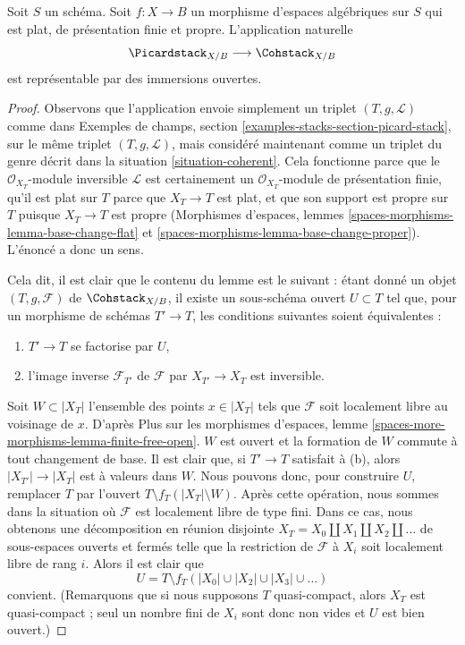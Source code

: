 \begin{lemma}
\label{lemma-picard-stack-open-in-coh}
Soit $S$ un schéma. Soit $f : X \to B$ un morphisme d'espaces algébriques sur
$S$ qui est plat, de présentation finie et propre. L'application naturelle
$$
\Picardstack_{X/B} \longrightarrow \Cohstack_{X/B}
$$
est représentable par des immersions ouvertes.
\end{lemma}

\begin{proof}
Observons que l'application envoie simplement un triplet
$(T, g, \mathcal{L})$ comme dans Exemples de champs, section
\ref{examples-stacks-section-picard-stack}, sur le même triplet
$(T, g, \mathcal{L})$, mais considéré maintenant comme un triplet du genre
décrit dans la situation \ref{situation-coherent}. Cela fonctionne parce que
le $\mathcal{O}_{X_T}$-module inversible $\mathcal{L}$ est certainement un
$\mathcal{O}_{X_T}$-module de présentation finie, qu'il est plat sur $T$ parce
que $X_T \to T$ est plat, et que son support est propre sur $T$ puisque
$X_T \to T$ est propre (Morphismes d'espaces, lemmes
\ref{spaces-morphisms-lemma-base-change-flat} et
\ref{spaces-morphisms-lemma-base-change-proper}). L'énoncé a donc un sens.

\medskip\noindent
Cela dit, il est clair que le contenu du lemme est le suivant : étant donné un
objet $(T, g, \mathcal{F})$ de $\Cohstack_{X/B}$, il existe un sous-schéma
ouvert $U \subset T$ tel que, pour un morphisme de schémas $T' \to T$, les
conditions suivantes soient équivalentes :
\begin{enumerate}
\item[(a)] $T' \to T$ se factorise par $U$,
\item[(b)] l'image inverse $\mathcal{F}_{T'}$ de $\mathcal{F}$ par
$X_{T'} \to X_T$ est inversible.
\end{enumerate}
Soit $W \subset |X_T|$ l'ensemble des points $x \in |X_T|$ tels que
$\mathcal{F}$ soit localement libre au voisinage de $x$. D'après Plus sur les
morphismes d'espaces, lemme
\ref{spaces-more-morphisms-lemma-finite-free-open}.
$W$ est ouvert et la formation de $W$ commute à tout changement de base. Il
est clair que, si $T' \to T$ satisfait à (b), alors
$|X_{T'}| \to |X_T|$ est à valeurs dans $W$. Nous pouvons donc, pour
construire $U$, remplacer $T$ par l'ouvert
$T \setminus f_T(|X_T| \setminus W)$. Après cette opération, nous sommes dans
la situation où $\mathcal{F}$ est localement libre de type fini. Dans ce cas,
nous obtenons une décomposition en réunion disjointe
$X_T = X_0 \amalg X_1 \amalg X_2 \amalg \ldots$ de sous-espaces ouverts et
fermés telle que la restriction de $\mathcal{F}$ à $X_i$ soit localement libre
de rang $i$. Alors il est clair que
$$
U = T \setminus f_T(|X_0| \cup |X_2| \cup |X_3| \cup \ldots )
$$
convient. (Remarquons que si nous supposons $T$ quasi-compact, alors $X_T$ est
quasi-compact ; seul un nombre fini de $X_i$ sont donc non vides et $U$ est
bien ouvert.)
\end{proof}

